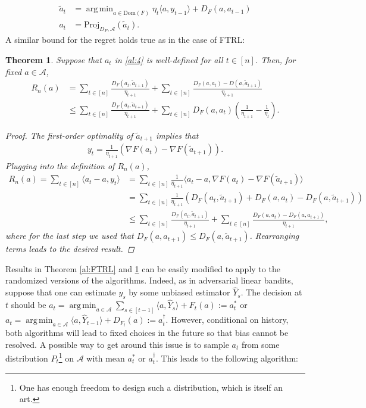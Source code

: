 \documentclass[letterpaper,11pt,openright,openany]{book}
\numberwithin{equation}{section}
\theoremstyle{plain}
\newtheorem{Th}{Theorem}[section]
\theoremstyle{definition}
\DeclareMathOperator*{\argmin}{arg\,min}
\begin{document}
\begin{align*}
\tilde{a}_t &= \argmin_{a\in\text{Dom}(F)}\eta_t\langle a, y_{t-1}\rangle + D_F(a, a_{t-1})\\
a_t &= \text{Proj}_{D_F, \mathcal A}(\tilde{a}_{t}).
\end{align*}
A similar bound for the regret holds true as in the case of FTRL:
\begin{Th}\label{al:MR}
Suppose that $a_t$ in \eqref{al:4} is well-defined for all $t\in [n]$. Then, for fixed $a\in\mathcal A$,  
\begin{align*}
R_n(a)&=\sum_{t\in [n]}\frac{D_F(a_t, \tilde{a}_{t+1})}{\eta_{t+1}}+\sum_{t\in [n]}\frac{D_F(a,a_t)-D(a,\tilde{a}_{t+1})}{\eta_{t+1}}\\
&\leq \sum_{t\in [n]}\frac{D_F(a_t, \tilde{a}_{t+1})}{\eta_{t+1}}+\sum_{t\in [n]}D_F(a,a_t)\left(\frac{1}{\eta_{t+1}}-\frac{1}{\eta_t}\right).
\end{align*}
\begin{proof}
The first-order optimality of $\tilde{a}_{t+1}$ implies that 
\begin{align*}
y_t = \frac{1}{\eta_{t+1}}\left(\nabla F(a_t)-\nabla F(\tilde{a}_{t+1})\right).
\end{align*}
Plugging into the definition of $R_n(a)$, 
\begin{align*}
R_n(a)=\sum_{t\in [n]}\langle a_t-a, y_t\rangle &= \sum_{t\in [n]}\frac{1}{\eta_{t+1}}\langle a_t-a, \nabla F(a_t)-\nabla F(\tilde{a}_{t+1})\rangle\\
& = \sum_{t\in [n]}\frac{1}{\eta_{t+1}}\left(D_F(a_t, \tilde{a}_{t+1})+D_F(a, a_t)-D_F(a, \tilde{a}_{t+1})\right)\\
& \leq \sum_{t\in [n]}\frac{D_F(a_t, \tilde{a}_{t+1})}{\eta_{t+1}}+\sum_{t\in [n]}\frac{D_F(a, a_t)-D_F(a, a_{t+1})}{\eta_{t+1}},
\end{align*}
where for the last step we used that $D_F(a, a_{t+1})\leq D_F(a, \tilde{a}_{t+1})$. Rearranging terms leads to the desired result. 
\end{proof}
\end{Th}
Results in Theorem \ref{al:FTRL} and \ref{al:MR} can be easily modified to apply to the randomized versions of the algorithms. Indeed, as in adversarial linear bandits, suppose that one can estimate $y_s$ by some unbiased estimator $\hat{Y}_{s}$.  The decision at $t$ should be $a_t=\argmin_{a\in\mathcal A}\sum_{s\in [t-1]}\langle a, \hat{Y}_s\rangle+F_t(a):=a_t^*$ or $a_{t}=\argmin_{a\in\mathcal A}\langle a, \hat{Y}_{t-1}\rangle+D_{F_{t}}(a):=a^{\dagger}_t$. However, conditional on history, both algorithms will lead to fixed choices in the future so that bias cannot be resolved. A possible way to get around this issue is to sample $a_t$ from some distribution $P_t$\footnote{One has enough freedom to design such a distribution, which is itself an art.} on $\mathcal A$ with mean $a_t^*$ or $a^{\dagger}_t$. This leads to the following algorithm:
\end{document}
